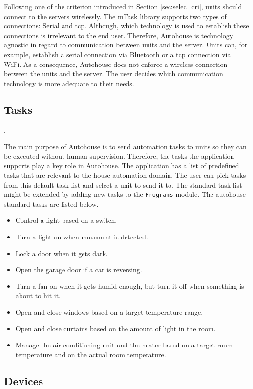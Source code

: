 Following one of the criterion introduced in Section \ref{sec:selec_cri}, units should connect to the servers wirelessly. The \gls{mTask} library supports two types of connections: Serial and \acs{tcp}. Although, which technology is used to establish these connections is irrelevant to the end user. Therefore, Autohouse is technology agnostic in regard to communication between units and the server. Units can, for example, establish a serial connection via Bluetooth or a \acs{tcp} connection via WiFi. As a consequence, Autohouse does not enforce a wireless connection between the units and the server. The user decides which communication technology is more adequate to their needs.

\subsection{Tasks}\label{sec:autohouse_tasks}.

The main purpose of Autohouse is to send automation tasks to units so they can be executed without human supervision. Therefore, the tasks the application supports play a key role in Autohouse. The application has a list of predefined tasks that are relevant to the house automation domain. The user can pick tasks from this default task list and select a unit to send it to. The standard task list might be extended by adding new tasks to the \texttt{Programs} module. The \gls{autohouse} standard tasks are listed below.

\begin{itemize}
    \item Control a light based on a switch. 
    \item Turn a light on when movement is detected.
    \item Lock a door when it gets dark.
    \item Open the garage door if a car is reversing.
    \item Turn a fan on when it gets humid enough, but turn it off when something is about to hit it.
    \item Open and close windows based on a target temperature range.
    \item Open and close curtains based on the amount of light in the room.
    \item Manage the air conditioning unit and the heater based on a target room temperature and on the actual room temperature.
\end{itemize}

\subsection{Devices}\label{sec:autohouse_devices}

